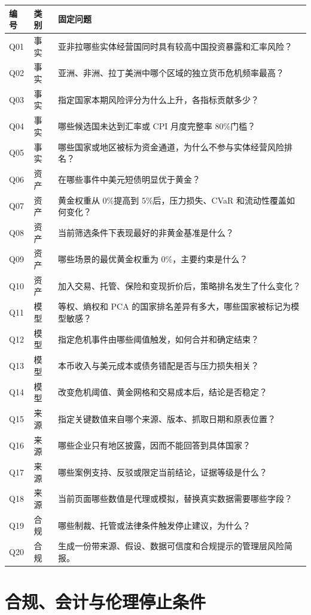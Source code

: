 \documentclass[UTF8,12pt,openany]{ctexbook}
\begin{document}
\begin{longtable}{p{1.0cm}p{2.0cm}p{10.8cm}}
\toprule
\textbf{编号} & \textbf{类别} & \textbf{固定问题}\\
\midrule
Q01 & 事实 & 亚非拉哪些实体经营国同时具有较高中国投资暴露和汇率风险？\\
Q02 & 事实 & 亚洲、非洲、拉丁美洲中哪个区域的独立货币危机频率最高？\\
Q03 & 事实 & 指定国家本期风险评分为什么上升，各指标贡献多少？\\
Q04 & 事实 & 哪些候选国未达到汇率或 CPI 月度完整率 80\%门槛？\\
Q05 & 事实 & 哪些国家或地区被标为资金通道，为什么不参与实体经营风险排名？\\
Q06 & 资产 & 在哪些事件中美元短债明显优于黄金？\\
Q07 & 资产 & 黄金权重从 0\%提高到 5\%后，压力损失、CVaR 和流动性覆盖如何变化？\\
Q08 & 资产 & 当前筛选条件下表现最好的非黄金基准是什么？\\
Q09 & 资产 & 哪些场景的最优黄金权重为 0\%，主要约束是什么？\\
Q10 & 资产 & 加入交易、托管、保险和变现折价后，策略排名发生了什么变化？\\
Q11 & 模型 & 等权、熵权和 PCA 的国家排名差异有多大，哪些国家被标记为模型敏感？\\
Q12 & 模型 & 指定危机事件由哪些阈值触发，如何合并和确定结束？\\
Q13 & 模型 & 本币收入与美元成本或债务错配是否与压力损失相关？\\
Q14 & 模型 & 改变危机阈值、黄金网格和交易成本后，结论是否稳定？\\
Q15 & 来源 & 指定关键数值来自哪个来源、版本、抓取日期和原表位置？\\
Q16 & 来源 & 哪些企业只有地区披露，因而不能回答到具体国家？\\
Q17 & 来源 & 哪些案例支持、反驳或限定当前结论，证据等级是什么？\\
Q18 & 来源 & 当前页面哪些数值是代理或模拟，替换真实数据需要哪些字段？\\
Q19 & 合规 & 哪些制裁、托管或法律条件触发停止建议，为什么？\\
Q20 & 合规 & 生成一份带来源、假设、数据可信度和合规提示的管理层风险简报。\\
\bottomrule
\end{longtable}

\chapter{合规、会计与伦理停止条件}
\end{document}
